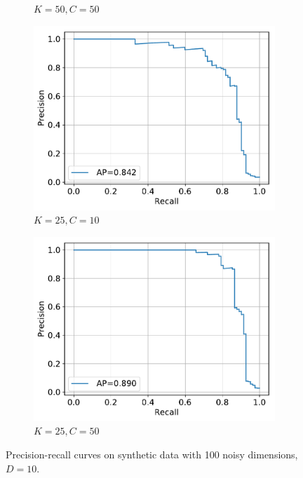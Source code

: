 \documentclass[11pt,onecolumn]{article}
\begin{document}
\begin{figure}[ht!]
\begin{subfigure}[t]{0.24\textwidth}
        \caption{$K=50, C=50$}
    \end{subfigure}
		\hfill
    \begin{subfigure}[t]{0.24\textwidth}
        \centering
        \includegraphics[width=\linewidth]{fig/chains_anomalyscore_pr_k25c10d10.pdf}
        \caption{$K=25, C=10$}
    \end{subfigure}
		\hfill
    \begin{subfigure}[t]{0.24\textwidth}
        \centering
        \includegraphics[width=\linewidth]{fig/chains_anomalyscore_pr_k25c50d10.pdf}
        \caption{$K=25, C=50$}
    \end{subfigure}
    \caption{Precision-recall curves on synthetic data with 100 noisy dimensions, $D=10$.}
\end{figure}
\end{document}
